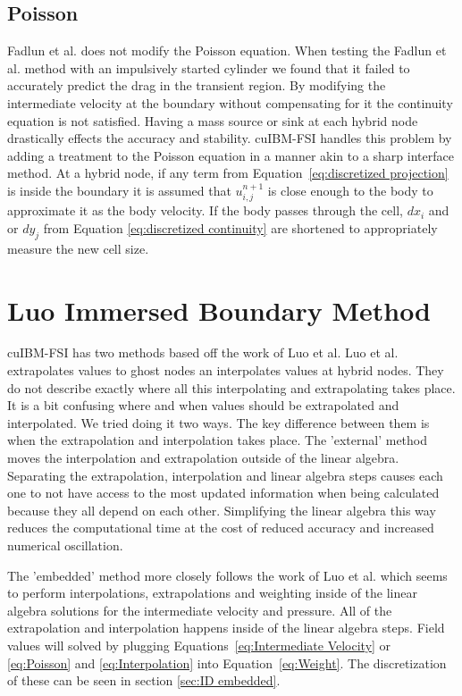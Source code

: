 \documentclass[onehalf,11pt]{beavtex}
\begin{document}
\subsection{Poisson}
\label{sec:ID fadlun poisson}
Fadlun et al. does not modify the Poisson equation. 
When testing the Fadlun et al. method with an impulsively started cylinder we found that it failed to accurately predict the drag in the transient region. 
By modifying the intermediate velocity at the boundary without compensating for it the continuity equation is not satisfied. 
Having a mass source or sink at each hybrid node drastically effects the accuracy and stability. 
cuIBM-FSI handles this problem by adding a treatment to the Poisson equation in a manner akin to a sharp interface method. 
At a hybrid node, if any term from Equation~\eqref{eq:discretized projection} is inside the boundary it is assumed that $u_{i,j}^{n+1}$ is close enough to the body to approximate it as the body velocity. 
If the body passes through the cell, $dx_i$ and or $dy_j$ from Equation \eqref{eq:discretized continuity} are shortened to appropriately measure the new cell size. 

\section{Luo Immersed Boundary Method}
\label{sec:ID luo}
cuIBM-FSI has two methods based off the work of Luo et al\cite{Luo:2012gx}. 
Luo et al. extrapolates values to ghost nodes an interpolates values at hybrid nodes.
They do not describe exactly where all this interpolating and extrapolating takes place. 
It is a bit confusing where and when values should be extrapolated and interpolated.
We tried doing it two ways.
The key difference between them is when the extrapolation and interpolation takes place.
The 'external' method moves the interpolation and extrapolation outside of the linear algebra.
Separating the extrapolation, interpolation and linear algebra steps causes each one to not have access to the most updated information when being calculated because they all depend on each other.
Simplifying the linear algebra this way reduces the computational time at the cost of reduced accuracy and increased numerical oscillation. 

The 'embedded' method more closely follows the work of Luo et al. which seems to perform  interpolations, extrapolations and weighting inside of the linear algebra solutions for the intermediate velocity and pressure. 
All of the extrapolation and interpolation happens inside of the linear algebra steps.
Field values will solved by plugging Equations~\eqref{eq:Intermediate Velocity} or \eqref{eq:Poisson} and \eqref{eq:Interpolation} into Equation~\eqref{eq:Weight}. 
The discretization of these can be seen in section \ref{sec:ID embedded}. 
\end{document}
